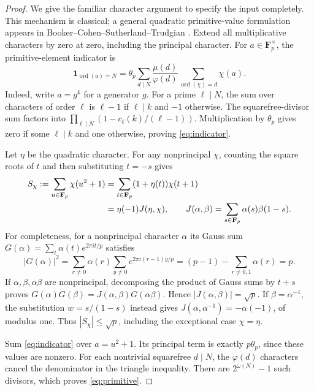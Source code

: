 \documentclass[11pt]{article}
\theoremstyle{remark}
\newcommand{\Fp}{\mathbf F_p}
\newcommand{\ord}{\operatorname{ord}}
\begin{document}
\begin{proof}
We give the familiar character argument to specify the input completely.
This mechanism is classical; a general quadratic primitive-value
formulation appears in Booker--Cohen--Sutherland--Trudgian
\cite[\S2, (5)--(6), Lemma 1]{BCST}.
Extend all multiplicative characters by zero at zero, including the
principal character. For $a\in\Fp^\times$, the primitive-element indicator is
\begin{equation}\label{eq:indicator}
 \boldsymbol1_{\ord(a)=N}
 =\theta_p\sum_{d\mid N}\frac{\mu(d)}{\varphi(d)}
             \sum_{\ord(\chi)=d}\chi(a).
\end{equation}
Indeed, write $a=g^k$ for a generator $g$. For a prime $\ell\mid N$,
the sum over characters of order $\ell$ is $\ell-1$ if $\ell\mid k$
and $-1$ otherwise. The squarefree-divisor sum factors into
$\prod_{\ell\mid N}(1-c_\ell(k)/(\ell-1))$. Multiplication by
$\theta_p$ gives zero if some $\ell\mid k$ and one otherwise, proving
\eqref{eq:indicator}.

Let $\eta$ be the quadratic character. For any nonprincipal $\chi$,
counting the square roots of $t$ and then substituting $t=-s$ gives
\begin{align}\label{eq:jacobi}
 S_\chi:=\sum_{u\in\Fp}\chi(u^2+1)
 &=\sum_{t\in\Fp}(1+\eta(t))\chi(t+1)\notag\\
 &=\eta(-1)J(\eta,\chi),\qquad
 J(\alpha,\beta)=\sum_{s\in\Fp}\alpha(s)\beta(1-s).
\end{align}
For completeness, for a nonprincipal character $\alpha$ its Gauss sum
$G(\alpha)=\sum_t\alpha(t)e^{2\pi i t/p}$ satisfies
\[
 |G(\alpha)|^2
 =\sum_{r\ne0}\alpha(r)\sum_{y\ne0}e^{2\pi i(r-1)y/p}
 =(p-1)-\sum_{r\ne0,1}\alpha(r)=p.
\]
If $\alpha,\beta,\alpha\beta$ are nonprincipal, decomposing the
product of Gauss sums by $t+s$ proves
$G(\alpha)G(\beta)=J(\alpha,\beta)G(\alpha\beta)$.
Hence $|J(\alpha,\beta)|=\sqrt p$. If $\beta=\alpha^{-1}$,
the substitution $w=s/(1-s)$ instead gives
$J(\alpha,\alpha^{-1})=-\alpha(-1)$, of modulus one.
Thus $|S_\chi|\le\sqrt p$, including the exceptional case $\chi=\eta$.

Sum \eqref{eq:indicator} over $a=u^2+1$. Its principal term is exactly
$p\theta_p$, since these values are nonzero. For each nontrivial
squarefree $d\mid N$, the $\varphi(d)$ characters cancel the denominator
in the triangle inequality. There are $2^{\omega(N)}-1$ such divisors,
which proves \eqref{eq:primitive}.
\end{proof}
\end{document}
